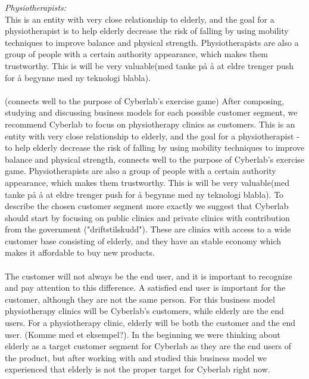 \emph{Physiotherapists:} \\
This is an entity with very close relationship to elderly, and the goal for a physiotherapist is to help elderly decrease the risk of falling by using mobility techniques to improve balance and physical strength. Physiotherapists are also a group of people with a certain authority appearance, which makes them trustworthy. This is will be very valuable(med tanke på å at eldre trenger push for å begynne med ny teknologi blabla).\\ \\
(connects well to the purpose of Cyberlab's exercise game)
After composing, studying and discussing business models for each possible customer segment, we recommend Cyberlab to focus on physiotherapy clinics as customers. This is an entity with very close relationship to elderly, and the goal for a physiotherapist - to help elderly decrease the risk of falling by using mobility techniques to improve balance and physical strength, connects well to the purpose of Cyberlab's exercise game. Physiotherapists are also a group of people with a certain authority appearance, which makes them trustworthy. This is will be very valuable(med tanke på å at eldre trenger push for å begynne med ny teknologi blabla).
To describe the chosen customer segment more exactly we suggest that Cyberlab should start by focusing on public clinics and private clinics with contribution from the government ("driftstilskudd"). These are clinics with access to a wide customer base consisting of elderly, and they have an stable economy which makes it affordable to buy new products. \\ \\
The customer will not always be the end user, and it is important to recognize and pay attention to this difference. A satisfied end user is important for the customer, although they are not the same person. For this business model physiotherapy clinics will be Cyberlab's customers, while elderly are the end users. For a physiotherapy clinic, elderly will be both the customer and the end user. (Komme med et eksempel?). In the beginning we were thinking about elderly as a target customer segment for Cyberlab as they are the end users of the product, but after working with and studied this business model we experienced that elderly is not the proper target for Cyberlab right now. 
